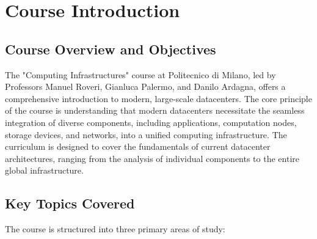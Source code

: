 \chapter{Course Introduction}

\section{Course Overview and Objectives}

The "Computing Infrastructures" course at Politecnico di Milano, led by Professors Manuel Roveri, Gianluca Palermo, and Danilo Ardagna, offers a comprehensive introduction to modern, large-scale datacenters. The core principle of the course is understanding that modern datacenters necessitate the seamless integration of diverse components, including applications, computation nodes, storage devices, and networks, into a unified computing infrastructure. The curriculum is designed to cover the fundamentals of current datacenter architectures, ranging from the analysis of individual components to the entire global infrastructure.

\section{Key Topics Covered}

The course is structured into three primary areas of study:

